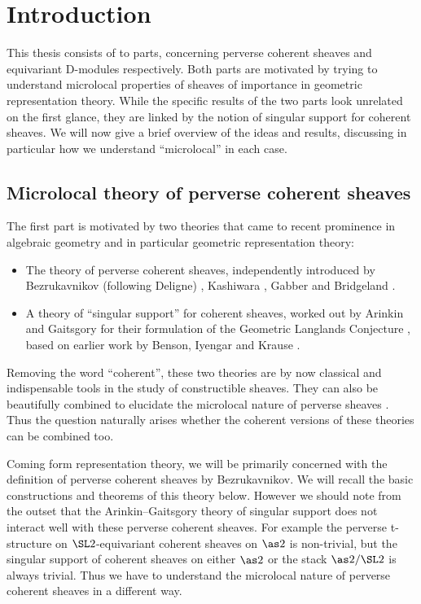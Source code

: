\chapter{Introduction}

This thesis consists of to parts, concerning perverse coherent sheaves and equivariant D-modules respectively.
Both parts are motivated by trying to understand microlocal properties of sheaves of importance in geometric representation theory.
While the specific results of the two parts look unrelated on the first glance, they are linked by the notion of singular support for coherent sheaves.
We will now give a brief overview of the ideas and results, discussing in particular how we understand \enquote{microlocal} in each case.

\section{Microlocal theory of perverse coherent sheaves}

The first part is motivated by two theories that came to recent prominence in algebraic geometry and in particular geometric representation theory:
\begin{itemize}
    \item The theory of perverse coherent sheaves, independently introduced by Bezrukavnikov (following Deligne) \cite{ArinkinBezrukavnikov:2010:PerverseCoherentSheaves}, Kashiwara \cite{Kashiwara:2004:tStructureOnHolonomicDModuleCoherentOModules}, Gabber \cite{Gabber:2004:NotesOnSomeTStructures} and Bridgeland \cite{Bridgeland:2006:DerivedCategoriesOfCoherentSheaves}.
    \item A theory of \enquote{singular support} for coherent sheaves, worked out by Arinkin and Gaitsgory for their formulation of the Geometric Langlands Conjecture \cite{ArinkinGaitsgory:2015:SingularSupport}, based on earlier work by Benson, Iyengar and Krause \cite{BensonIyengarKrause:2008:LocalCohomologyAndSupportForTriangulatedCategories}.
\end{itemize}
Removing the word \enquote{coherent}, these two theories are by now classical and indispensable tools in the study of constructible sheaves.
They can also be beautifully combined to elucidate the microlocal nature of perverse sheaves \cite{KashiwaraSchapira:1994:SheavesOnManifolds}.
Thus the question naturally arises whether the coherent versions of these theories can be combined too.

Coming form representation theory, we will be primarily concerned with the definition of perverse coherent sheaves by Bezrukavnikov.
We will recall the basic constructions and theorems of this theory below.
However we should note from the outset that the Arinkin--Gaitsgory theory of singular support does not interact well with these perverse coherent sheaves.
For example the perverse t-structure on $\SL2$-equivariant coherent sheaves on $\as2$ is non-trivial, but the singular support of coherent sheaves on either $\as2$ or the stack $\as2/\SL2$ is always trivial.
Thus we have to understand the microlocal nature of perverse coherent sheaves in a different way.


